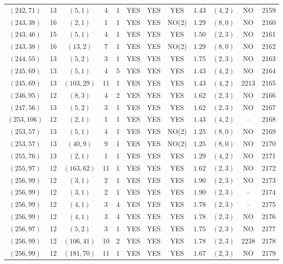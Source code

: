 \begin{longtable}{|c|c|c|c|c|c|c|c|c|c|c|c|}
$(242,71)$ & 13 & $(5,1)$ & 4 & 1 & YES & YES & YES & $1.43$ & $(4,2)$ & NO & 2159\\
$(243,38)$ & 16 & $(2,1)$ & 1 & 1 & YES & YES & NO(2) & $1.29$ & $(8,0)$ & NO & 2160\\
$(243,46)$ & 15 & $(5,1)$ & 4 & 1 & YES & YES & YES & $1.50$ & $(2,3)$ & NO & 2161\\
$(243,38)$ & 16 & $(13,2)$ & 7 & 1 & YES & YES & NO(2) & $1.29$ & $(8,0)$ & NO & 2162\\
$(244,55)$ & 13 & $(5,2)$ & 3 & 1 & YES & YES & YES & $1.75$ & $(2,3)$ & NO & 2163\\
$(245,69)$ & 13 & $(5,1)$ & 4 & 5 & YES & YES & YES & $1.43$ & $(4,2)$ & NO & 2164\\
$(245,69)$ & 13 & $(103,29)$ & 11 & 1 & YES & YES & YES & $1.43$ & $(4,2)$ & 2213 & 2165\\
$(246,95)$ & 12 & $(8,3)$ & 4 & 2 & YES & YES & YES & $1.62$ & $(2,3)$ & NO & 2166\\
$(247,56)$ & 13 & $(5,2)$ & 3 & 1 & YES & YES & YES & $1.62$ & $(2,3)$ & NO & 2167\\
$(253,106)$ & 12 & $(2,1)$ & 1 & 1 & YES & YES & YES & $1.43$ & $(4,2)$ & -- & 2168\\
$(253,57)$ & 13 & $(5,1)$ & 4 & 1 & YES & YES & NO(2) & $1.25$ & $(8,0)$ & NO & 2169\\
$(253,57)$ & 13 & $(40,9)$ & 9 & 1 & YES & YES & NO(2) & $1.25$ & $(8,0)$ & NO & 2170\\
$(255,76)$ & 13 & $(2,1)$ & 1 & 1 & YES & YES & YES & $1.29$ & $(4,2)$ & NO & 2171\\
$(255,97)$ & 12 & $(163,62)$ & 11 & 1 & YES & YES & YES & $1.62$ & $(2,3)$ & NO & 2172\\
$(256,99)$ & 12 & $(3,1)$ & 2 & 1 & YES & YES & YES & $1.90$ & $(2,3)$ & NO & 2173\\
$(256,99)$ & 12 & $(3,1)$ & 2 & 1 & YES & YES & YES & $1.90$ & $(2,3)$ & -- & 2174\\
$(256,99)$ & 12 & $(4,1)$ & 3 & 4 & YES & YES & YES & $1.78$ & $(2,3)$ & -- & 2175\\
$(256,99)$ & 12 & $(4,1)$ & 3 & 4 & YES & YES & YES & $1.78$ & $(2,3)$ & NO & 2176\\
$(256,97)$ & 12 & $(5,2)$ & 3 & 1 & YES & YES & YES & $1.75$ & $(2,3)$ & NO & 2177\\
$(256,99)$ & 12 & $(106,41)$ & 10 & 2 & YES & YES & YES & $1.78$ & $(2,3)$ & 2238 & 2178\\
$(256,99)$ & 12 & $(181,70)$ & 11 & 1 & YES & YES & YES & $1.67$ & $(2,3)$ & NO & 2179\\

\end{longtable}
